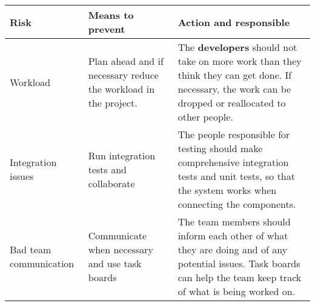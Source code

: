 \begin{adjustbox}{center}
\begin{tabular}{ p{0.1\paperwidth} | p{0.25\paperwidth} | p{0.3\paperwidth} }
    Risk & Means to prevent & Action and responsible \\ \hline
    Workload
    & Plan ahead and if necessary reduce the workload in the project.
    & The \textbf{developers} should not take on more work than they think they can get done. If necessary, the work can be dropped or reallocated to other people. \\ \hline
    Integration issues
    & Run integration tests and collaborate
    & The people responsible for testing should make comprehensive integration tests and unit tests, so that the system works when connecting the components. \\ \hline
    Bad team communication
    & Communicate when necessary and use task boards
    & The team members should inform each other of what they are doing and of any potential issues. Task boards can help the team keep track of what is being worked on. \\ \hline
\end{tabular}
\end{adjustbox}